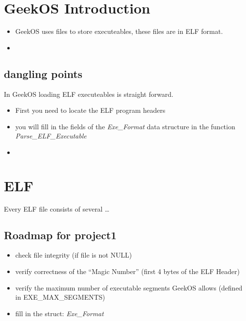 \section{GeekOS Introduction}

\begin{itemize}
  \item GeekOS uses files to store executeables, these files are in ELF format.
  \item 
\end{itemize}

\subsection{dangling points}
In GeekOS loading ELF executeables is straight forward.
\begin{itemize}
  \item First you need to locate the ELF program headers
  \item you will fill in the fields of the \textit{Exe\_Format} data structure in the function \textit{Parse\_ELF\_Executable}
  \item 
\end{itemize}

\section{ELF}
Every ELF file consists of several \ldots 








\subsection{Roadmap for project1}
\begin{itemize}
  \item check file integrity (if file is not NULL)
  \item verify correctness of the ``Magic Number'' (first 4 bytes of the ELF Header)%
  \item verify the maximum number of executable segments GeekOS allows  (defined in EXE\_MAX\_SEGMENTS)%
  \item fill in the struct: \textit{Exe\_Format}
\end{itemize}

